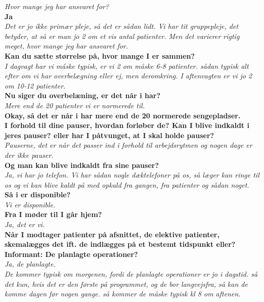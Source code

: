 \textit{Hvor mange jeg har ansvaret for?} \\
\noindent
\textbf{Ja} \\
\noindent
\textit{Det er jo ikke primær pleje, så det er sådan lidt. Vi har tit gruppepleje, det betyder, at så er man jo 2 om et vis antal patienter. Men det varierer rigtig meget, hvor mange jeg har ansvaret for.} \\
\noindent
\textbf{Kan du sætte størrelse på, hvor mange I er sammen?} \\
\noindent
\textit{I dagvagt har vi måske typisk, er vi 2 om måske 6-8 patienter. sådan typisk alt efter om vi har overbelægning eller ej, men deromkring. I aftenvagten er vi jo 2 om 10-12 patienter.} \\
\noindent
\textbf{Nu siger du overbelæning, er det når i har?} \\
\noindent
\textit{Mere end de 20 patienter vi er normerede til.} \\
\noindent
\textbf{Okay, så det er når i har mere end de 20 normerede sengepladser. } \\
\noindent
\textbf{I forhold til dine pauser, hvordan forløber de? Kan I blive indkaldt i jeres pauser? eller har I påtvunget, at I skal holde pauser?} \\
\noindent
\textit{Pauserne, det er når det passer ind i forhold til arbejdsrytmen og nogen dage er der ikke pauser.} \\
\noindent
\textbf{Og man kan blive indkaldt fra sine pauser?} \\
\noindent
\textit{Ja, vi har jo telefon. Vi har sådan nogle dæktelefoner på os, så læger kan ringe til os og vi kan blive kaldt på med opkald fra gangen, fra patienter og sådan noget.}
\textbf{Så i er disponible?} \\
\noindent
\textit{Vi er disponible.} \\
\noindent
\textbf{Fra I møder til I går hjem?} \\
\noindent
\textit{Ja, det er vi.}  \\
\noindent
\textbf{Når I modtager patienter på afsnittet, de elektive patienter, skemalægges det ift. de indlægges på et bestemt tidspunkt eller?
Informant: De planlagte operationer?} \\
\noindent
\textit{Ja, de planlagte.} \\
\noindent
\textit{De kommer typisk om morgenen, fordi de planlagte operationer er jo i dagstid. så det kun, hvis det er den første på programmet, og de bor langvejsfra, så kan de komme dagen før nogen gange. så kommer de måske typisk kl 8 om aftenen.} \\
